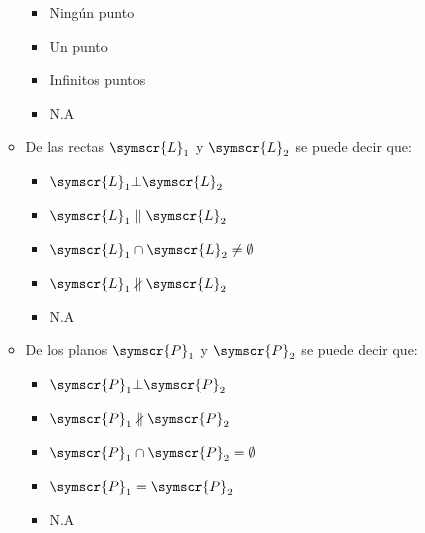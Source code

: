 \documentclass{article}
\def\fancyL{\symscr{L}}
\def\fancyP{\symscr{P}}
\begin{document}
\begin{enumerate}
\begin{itemize}
            \begin{itemize}
				\item Ningún punto
				\item Un punto
				\item Infinitos puntos
				\item N.A
            \end{itemize}
        \item De las rectas \(\fancyL_1\) y \(\fancyL_2\) se puede decir que:
            \begin{itemize}
                \item \(\fancyL_1 \bot \fancyL_2\)
                \item \(\fancyL_1 \parallel \fancyL_2\)
                \item \(\fancyL_1 \cap \fancyL_2 \neq \emptyset\)
                \item \(\fancyL_1 \nparallel \fancyL_2\)
                \item N.A
            \end{itemize}
        \item De los planos \(\fancyP_1\) y \(\fancyP_2\) se puede decir que:
            \begin{itemize}
                \item \(\fancyP_1 \bot \fancyP_2\)
                \item \(\fancyP_1 \nparallel \fancyP_2\)
                \item \(\fancyP_1 \cap \fancyP_2 = \emptyset\)
                \item \(\fancyP_1 = \fancyP_2\)
                \item N.A
            \end{itemize}
    \end{itemize}
\end{enumerate}
\end{document}
